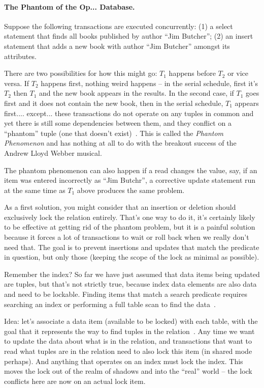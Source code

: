 \documentclass[a4paper]{report}
\begin{document}
\paragraph{The Phantom of the Op... Database.} Suppose the following transactions are executed concurrently: (1) a select statement that finds all books published by author ``Jim Butcher''; (2) an insert statement that adds a new book with author ``Jim Butcher'' amongst its attributes. 

There are two possibilities for how this might go: $T_{1}$ happens before $T_{2}$ or vice versa. If $T_{2}$ happens first, nothing weird happens -- in the serial schedule, first it's $T_{2}$ then $T_{1}$ and the new book appears in the results. In the second case, if $T_{1}$ goes first and it does not contain the new book, then in the serial schedule, $T_{1}$ appears first.... except... these transactions do not operate on any tuples in common and yet there is still some dependencies between them, and they conflict on a ``phantom'' tuple (one that doesn't exist)~\cite{dsc}. This is called the \textit{Phantom Phenomenon} and has nothing at all to do with the breakout success of the Andrew Lloyd Webber musical. 

The phantom phenomenon can also happen if a read changes the value, say, if an item was entered incorrectly as ``Jim Butchr'', a corrective update statement run at the same time as $T_{1}$ above produces the same problem.

As a first solution, you might consider that an insertion or deletion should exclusively lock the relation entirely. That's one way to do it, it's certainly likely to be effective at getting rid of the phantom problem, but it is a painful solution because it forces a lot of transactions to wait or roll back when we really don't need that. The goal is to prevent insertions and updates that match the predicate in question, but only those (keeping the scope of the lock as minimal as possible).

Remember the index? So far we have just assumed that data items being updated are tuples, but that's not strictly true, because index data elements are also data and need to be lockable. Finding items that match a search predicate requires searching an index or performing a full table scan to find the data~\cite{dsc}. 

Idea: let's associate a data item (available to be locked) with each table, with the goal that it represents the way to find tuples in the relation~\cite{dsc}. Any time we want to update the data about what is in the relation, and transactions that want to read what tuples are in the relation need to also lock this item (in shared mode perhaps). And anything that operates on an index must lock the index. This moves the lock out of the realm of shadows and into the ``real'' world -- the lock conflicts here are now on an actual lock item.
\end{document}
